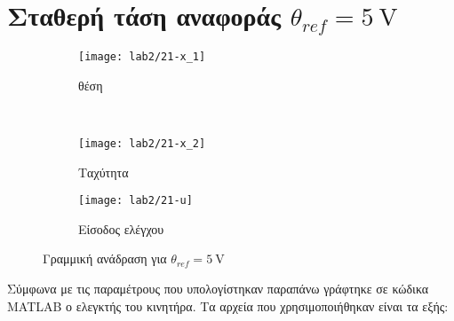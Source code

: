 \section[Σταθερή τάση αναφοράς]{Σταθερή τάση αναφοράς $\theta_{ref} = \SI{5}{\volt}$}
\begin{figure}
  \centering
  \begin{subfigure}[t]{\linewidth}
    \texttt{[image: lab2/21-x\_1]}
    \caption{θέση}
    \label{fig:21-x_1}
  \end{subfigure}\\
  \begin{subfigure}[t]{0.45\linewidth}
    \texttt{[image: lab2/21-x\_2]}
    \caption{Ταχύτητα}
    \label{fig:21-x_2}
  \end{subfigure}\hfill
  \begin{subfigure}[t]{0.45\linewidth}
    \texttt{[image: lab2/21-u]}
    \caption{Είσοδος ελέγχου}
    \label{fig:21-u}
  \end{subfigure}
  \caption[Γραμμική ανάδραση με σταθερή τάση αναφοράς]{Γραμμική ανάδραση για $\theta_{ref} = \SI{5}{\volt}$}
  \label{fig:21}
\end{figure}
Σύμφωνα με τις παραμέτρους που υπολογίστηκαν παραπάνω γράφτηκε σε κώδικα MATLAB ο ελεγκτής του κινητήρα.
Τα αρχεία που χρησιμοποιήθηκαν είναι τα εξής:
